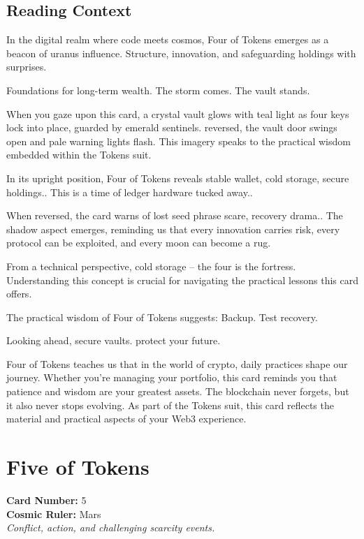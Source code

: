 \documentclass[11pt,oneside]{book}
\begin{document}
\begin{minipage}[t]{0.55\textwidth}
  \subsection*{Reading Context}
  In the digital realm where code meets cosmos, Four of Tokens emerges as a beacon of uranus influence. Structure, innovation, and safeguarding holdings with surprises.

  Foundations for long-term wealth. The storm comes. The vault stands.

  When you gaze upon this card, a crystal vault glows with teal light as four keys lock into place, guarded by emerald sentinels. reversed, the vault door swings open and pale warning lights flash. This imagery speaks to the practical wisdom embedded within the Tokens suit.

  In its upright position, Four of Tokens reveals stable wallet, cold storage, secure holdings.. This is a time of ledger hardware tucked away..

  When reversed, the card warns of lost seed phrase scare, recovery drama.. The shadow aspect emerges, reminding us that every innovation carries risk, every protocol can be exploited, and every moon can become a rug.

  From a technical perspective, cold storage – the four is the fortress. Understanding this concept is crucial for navigating the practical lessons this card offers.

  The practical wisdom of Four of Tokens suggests: Backup. Test recovery.

  Looking ahead, secure vaults. protect your future.

  Four of Tokens teaches us that in the world of crypto, daily practices shape our journey. Whether you're managing your portfolio, this card reminds you that patience and wisdom are your greatest assets. The blockchain never forgets, but it also never stops evolving. As part of the Tokens suit, this card reflects the material and practical aspects of your Web3 experience.

\end{minipage}

\newpage
\section*{Five of Tokens}

\begin{minipage}[t]{0.55\textwidth}
  \vspace{0pt}
  \textbf{Card Number:} 5\\  \textbf{Cosmic Ruler:} Mars\\  \textit{Conflict, action, and challenging scarcity events.}
\end{minipage}
\end{document}
